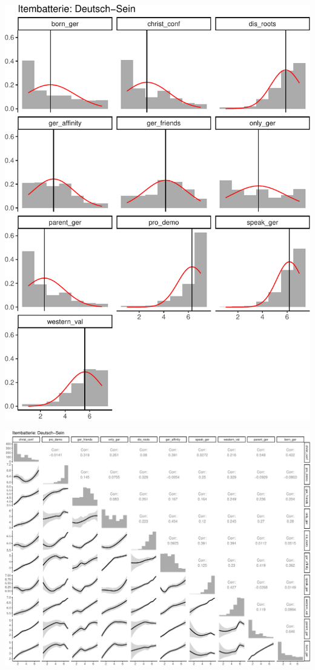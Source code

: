 \documentclass[]{article}
\begin{document}
\begin{center}\includegraphics{session_1_files/figure-latex/vis-1} \end{center}

\begin{center}\includegraphics{session_1_files/figure-latex/unnamed-chunk-1-1} \end{center}
\end{document}
